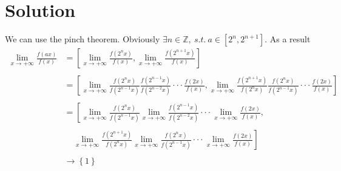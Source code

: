\documentclass[12pt,a4paper]{article}%
\begin{document}
	\section*{Solution}
	\noindent We can use the pinch theorem. Obviously $\exists n\in \mathbb{Z},\  s.t.\ a\in[2^n,2^{n+1}]$. As a result
	\begin{align*}
		 \lim _{x\rightarrow +\infty}\frac{f\left( ax \right)}{f\left( x \right)} &=\left[ \lim _{x\rightarrow +\infty}\frac{f\left( 2^nx \right)}{f\left( x \right)},\lim _{x\rightarrow +\infty}\frac{f\left( 2^{n+1}x \right)}{f\left( x \right)} \right] \\\\
		 &=\left[ \lim _{x\rightarrow +\infty}\frac{f\left( 2^nx \right)}{f\left( 2^{n-1}x \right)}\frac{f\left( 2^{n-1}x \right)}{f\left( 2^{n-2}x \right)}\cdot \cdot \cdot \frac{f\left( 2x \right)}{f\left( x \right)},\lim _{x\rightarrow +\infty}\frac{f\left( 2^{n+1}x \right)}{f\left( 2^nx \right)}\frac{f\left( 2^nx \right)}{f\left( 2^{n-1}x \right)}\cdot \cdot \cdot \frac{f\left( 2x \right)}{f\left( x \right)} \right] \\\\
		 &=\left[ \lim _{x\rightarrow +\infty}\frac{f\left( 2^nx \right)}{f\left( 2^{n-1}x \right)}\lim _{x\rightarrow +\infty}\frac{f\left( 2^{n-1}x \right)}{f\left( 2^{n-2}x \right)}\cdot \cdot \cdot \lim _{x\rightarrow +\infty}\frac{f\left( 2x \right)}{f\left( x \right)},\right.\\\\
		 &\left.\ \ \ \ \ \lim _{x\rightarrow +\infty}\frac{f\left( 2^{n+1}x \right)}{f\left( 2^nx \right)}\lim _{x\rightarrow +\infty}\frac{f\left( 2^nx \right)}{f\left( 2^{n-1}x \right)}\cdot \cdot \cdot \lim _{x\rightarrow +\infty}\frac{f\left( 2x \right)}{f\left( x \right)}\right]\\\\
		 &\rightarrow \left\{ 1 \right\}
	\end{align*}
	
	\newpage%

	
\end{document}
